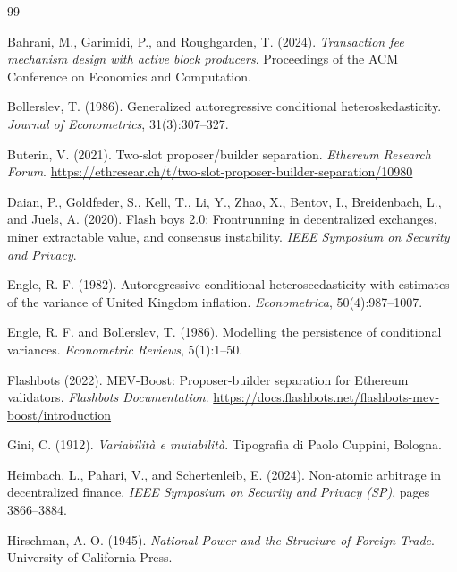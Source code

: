 \documentclass[11pt]{article}
\begin{document}

\begin{thebibliography}{99}

Bahrani, M., Garimidi, P., and Roughgarden, T. (2024).
\textit{Transaction fee mechanism design with active block producers}.
Proceedings of the ACM Conference on Economics and Computation.

Bollerslev, T. (1986).
Generalized autoregressive conditional heteroskedasticity.
\textit{Journal of Econometrics}, 31(3):307--327.

Buterin, V. (2021).
Two-slot proposer/builder separation.
\textit{Ethereum Research Forum}.
\url{https://ethresear.ch/t/two-slot-proposer-builder-separation/10980}

Daian, P., Goldfeder, S., Kell, T., Li, Y., Zhao, X., Bentov, I.,
Breidenbach, L., and Juels, A. (2020).
Flash boys 2.0: Frontrunning in decentralized exchanges, miner extractable
value, and consensus instability.
\textit{IEEE Symposium on Security and Privacy}.

Engle, R. F. (1982).
Autoregressive conditional heteroscedasticity with estimates of the variance
of United Kingdom inflation.
\textit{Econometrica}, 50(4):987--1007.

Engle, R. F. and Bollerslev, T. (1986).
Modelling the persistence of conditional variances.
\textit{Econometric Reviews}, 5(1):1--50.

Flashbots (2022).
MEV-Boost: Proposer-builder separation for Ethereum validators.
\textit{Flashbots Documentation}.
\url{https://docs.flashbots.net/flashbots-mev-boost/introduction}

Gini, C. (1912).
\textit{Variabilit\`a e mutabilit\`a}.
Tipografia di Paolo Cuppini, Bologna.

Heimbach, L., Pahari, V., and Schertenleib, E. (2024).
Non-atomic arbitrage in decentralized finance.
\textit{IEEE Symposium on Security and Privacy (SP)}, pages 3866--3884.

Hirschman, A. O. (1945).
\textit{National Power and the Structure of Foreign Trade}.
University of California Press.


\end{thebibliography}
\end{document}
